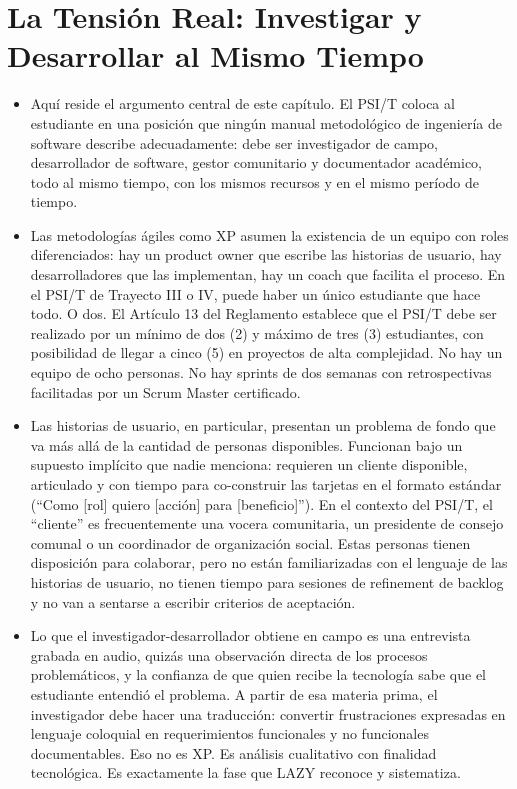 \documentclass[14pt,a4paper,oneside]{extbook}
\begin{document}
\section{La Tensión Real: Investigar y Desarrollar al Mismo Tiempo}
\begin{itemize}
\item Aquí reside el argumento central de este capítulo. El PSI/T coloca al estudiante en una posición que ningún manual metodológico de ingeniería de software describe adecuadamente: debe ser investigador de campo, desarrollador de software, gestor comunitario y documentador académico, todo al mismo tiempo, con los mismos recursos y en el mismo período de tiempo.
\item Las metodologías ágiles como XP asumen la existencia de un equipo con roles diferenciados: hay un product owner que escribe las historias de usuario, hay desarrolladores que las implementan, hay un coach que facilita el proceso. En el PSI/T de Trayecto III o IV, puede haber un único estudiante que hace todo. O dos. El Artículo 13 del Reglamento establece que el PSI/T debe ser realizado por un mínimo de dos (2) y máximo de tres (3) estudiantes, con posibilidad de llegar a cinco (5) en proyectos de alta complejidad. No hay un equipo de ocho personas. No hay sprints de dos semanas con retrospectivas facilitadas por un Scrum Master certificado.
\item Las historias de usuario, en particular, presentan un problema de fondo que va más allá de la cantidad de personas disponibles. Funcionan bajo un supuesto implícito que nadie menciona: requieren un cliente disponible, articulado y con tiempo para co-construir las tarjetas en el formato estándar (\enquote{Como [rol] quiero [acción] para [beneficio]}). En el contexto del PSI/T, el \enquote{cliente} es frecuentemente una vocera comunitaria, un presidente de consejo comunal o un coordinador de organización social. Estas personas tienen disposición para colaborar, pero no están familiarizadas con el lenguaje de las historias de usuario, no tienen tiempo para sesiones de refinement de backlog y no van a sentarse a escribir criterios de aceptación.
\item Lo que el investigador-desarrollador obtiene en campo es una entrevista grabada en audio, quizás una observación directa de los procesos problemáticos, y la confianza de que quien recibe la tecnología sabe que el estudiante entendió el problema. A partir de esa materia prima, el investigador debe hacer una traducción: convertir frustraciones expresadas en lenguaje coloquial en requerimientos funcionales y no funcionales documentables. Eso no es XP. Es análisis cualitativo con finalidad tecnológica. Es exactamente la fase que LAZY reconoce y sistematiza.
\end{itemize}
\end{document}

